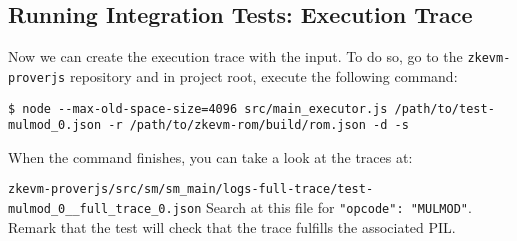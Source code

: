 \subsection{Running Integration Tests: Execution Trace}

Now we can create the execution trace with the input. To do so, go to the \texttt{zkevm-proverjs} repository and in project root, execute the following command:

\begin{lstlisting}[style=termt]
$ node --max-old-space-size=4096 src/main_executor.js /path/to/test-mulmod_0.json -r /path/to/zkevm-rom/build/rom.json -d -s
\end{lstlisting}

When the command finishes, you can take a look at the traces at:

\texttt{zkevm-proverjs/src/sm/sm\_main/logs-full-trace/test-mulmod\_0\_\_full\_trace\_0.json}
Search at this file for \texttt{"opcode": "MULMOD"}. Remark that the test will check that the trace fulfills the associated PIL.




